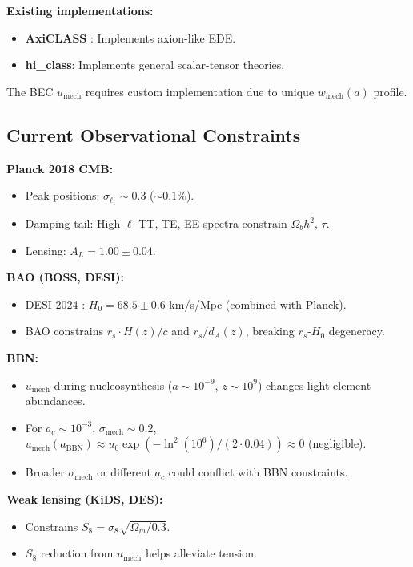 \documentclass[11pt,a4paper]{article}
\newcommand{\umech}{\ensuremath{u_{\mathrm{mech}}}}
\newcommand{\wmech}{\ensuremath{w_{\mathrm{mech}}}}
\newcommand{\ac}{\ensuremath{a_c}}
\newcommand{\sigmamech}{\ensuremath{\sigma_{\mathrm{mech}}}}
\newcommand{\rs}{\ensuremath{r_s}}
\newcommand{\dA}{\ensuremath{d_A}}
\newcommand{\Omm}{\ensuremath{\Omega_m}}
\newcommand{\Omb}{\ensuremath{\Omega_b}}
\theoremstyle{definition}
\theoremstyle{remark}
\begin{document}
\textbf{Existing implementations:}
\begin{itemize}[leftmargin=*, itemsep=0.2em]
\item \textbf{AxiCLASS} \cite{Poulin2019}: Implements axion-like EDE.
\item \textbf{hi\_class}: Implements general scalar-tensor theories.
\end{itemize}

The BEC $\umech$ requires custom implementation due to unique $\wmech(a)$ profile.

\subsection{Current Observational Constraints}
\label{sec:current_constraints}

\textbf{Planck 2018 CMB:}
\begin{itemize}[leftmargin=*, itemsep=0.2em]
\item Peak positions: $\sigma_{\ell_1} \sim 0.3$ ($\sim 0.1\%$).
\item Damping tail: High-$\ell$ TT, TE, EE spectra constrain $\Omb h^2$, $\tau$.
\item Lensing: $A_L = 1.00 \pm 0.04$.
\end{itemize}

\textbf{BAO (BOSS, DESI):}
\begin{itemize}[leftmargin=*, itemsep=0.2em]
\item DESI 2024 \cite{DESI2024}: $H_0 = 68.5 \pm 0.6$ km/s/Mpc (combined with Planck).
\item BAO constrains $\rs \cdot H(z)/c$ and $\rs/\dA(z)$, breaking $\rs$-$H_0$ degeneracy.
\end{itemize}

\textbf{BBN:}
\begin{itemize}[leftmargin=*, itemsep=0.2em]
\item $\umech$ during nucleosynthesis ($a \sim 10^{-9}$, $z \sim 10^9$) changes light element abundances.
\item For $\ac \sim 10^{-3}$, $\sigmamech \sim 0.2$, $\umech(a_{\mathrm{BBN}}) \approx u_0 \exp(-\ln^2(10^6)/(2 \cdot 0.04)) \approx 0$ (negligible).
\item Broader $\sigmamech$ or different $\ac$ could conflict with BBN constraints.
\end{itemize}

\textbf{Weak lensing (KiDS, DES):}
\begin{itemize}[leftmargin=*, itemsep=0.2em]
\item Constrains $S_8 = \sigma_8 \sqrt{\Omm/0.3}$.
\item $S_8$ reduction from $\umech$ helps alleviate tension.
\end{itemize}
\end{document}
